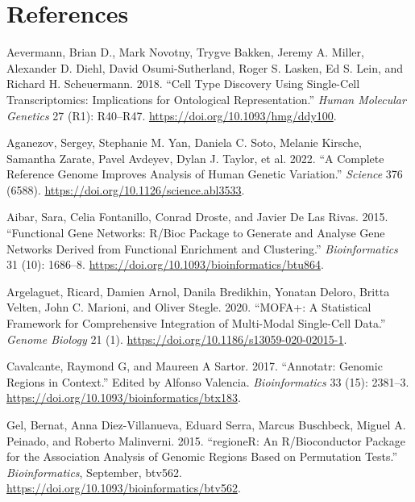 \newpage

\hypertarget{refs}{%
\section*{References}\label{refs}}

\hypertarget{refs}{}
\begin{cslreferences}
\leavevmode\hypertarget{ref-Aevermann2018}{}%
Aevermann, Brian D., Mark Novotny, Trygve Bakken, Jeremy A. Miller, Alexander D. Diehl, David Osumi-Sutherland, Roger S. Lasken, Ed S. Lein, and Richard H. Scheuermann. 2018. ``Cell Type Discovery Using Single-Cell Transcriptomics: Implications for Ontological Representation.'' \emph{Human Molecular Genetics} 27 (R1): R40--R47. \url{https://doi.org/10.1093/hmg/ddy100}.

\leavevmode\hypertarget{ref-Aganezov2022}{}%
Aganezov, Sergey, Stephanie M. Yan, Daniela C. Soto, Melanie Kirsche, Samantha Zarate, Pavel Avdeyev, Dylan J. Taylor, et al. 2022. ``A Complete Reference Genome Improves Analysis of Human Genetic Variation.'' \emph{Science} 376 (6588). \url{https://doi.org/10.1126/science.abl3533}.

\leavevmode\hypertarget{ref-Aibar2015}{}%
Aibar, Sara, Celia Fontanillo, Conrad Droste, and Javier De Las Rivas. 2015. ``Functional Gene Networks: R/Bioc Package to Generate and Analyse Gene Networks Derived from Functional Enrichment and Clustering.'' \emph{Bioinformatics} 31 (10): 1686--8. \url{https://doi.org/10.1093/bioinformatics/btu864}.

\leavevmode\hypertarget{ref-Argelaguet2020}{}%
Argelaguet, Ricard, Damien Arnol, Danila Bredikhin, Yonatan Deloro, Britta Velten, John C. Marioni, and Oliver Stegle. 2020. ``MOFA+: A Statistical Framework for Comprehensive Integration of Multi-Modal Single-Cell Data.'' \emph{Genome Biology} 21 (1). \url{https://doi.org/10.1186/s13059-020-02015-1}.

\leavevmode\hypertarget{ref-Cavalcante2017}{}%
Cavalcante, Raymond G, and Maureen A Sartor. 2017. ``Annotatr: Genomic Regions in Context.'' Edited by Alfonso Valencia. \emph{Bioinformatics} 33 (15): 2381--3. \url{https://doi.org/10.1093/bioinformatics/btx183}.

\leavevmode\hypertarget{ref-Gel2015}{}%
Gel, Bernat, Anna Diez-Villanueva, Eduard Serra, Marcus Buschbeck, Miguel A. Peinado, and Roberto Malinverni. 2015. ``regioneR: An R/Bioconductor Package for the Association Analysis of Genomic Regions Based on Permutation Tests.'' \emph{Bioinformatics}, September, btv562. \url{https://doi.org/10.1093/bioinformatics/btv562}.


\end{cslreferences}
